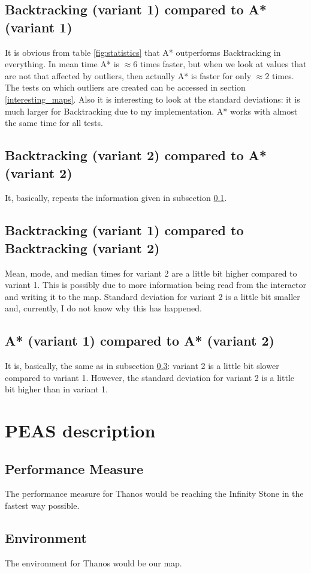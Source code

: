 \documentclass{article}
\begin{document}
\subsection{Backtracking (variant 1) compared to A* (variant 1)} \label{backtracking_1_vs_a_star_1}
It is obvious from table \ref{fig:statistics} that A* outperforms Backtracking in everything.
In mean time A* is $\approx 6$ times faster, but when we look at values that are not that affected by outliers, then actually A* is faster for only $\approx 2$ times.
The tests on which outliers are created can be accessed in section \ref{interesting_maps}.
Also it is interesting to look at the standard deviations: it is much larger for Backtracking due to my implementation. A* works with almost the same time for all tests.
\subsection{Backtracking (variant 2) compared to A* (variant 2)}
It, basically, repeats the information given in subsection \ref{backtracking_1_vs_a_star_1}.
\subsection{Backtracking (variant 1) compared to Backtracking (variant 2)} \label{backtracking_1_vs_backtracking_2}
Mean, mode, and median times for variant 2 are a little bit higher compared to variant 1. This is possibly due to more information being read from the interactor and writing it to the map.
Standard deviation for variant 2 is a little bit smaller and, currently, I do not know why this has happened.
\subsection{A* (variant 1) compared to A* (variant 2)}
It is, basically, the same as in subsection \ref{backtracking_1_vs_backtracking_2}: variant 2 is a little bit slower compared to variant 1. However, the standard deviation for variant 2 is a little bit higher than in variant 1.
\section{PEAS description}
\subsection{Performance Measure}
The performance measure for Thanos would be reaching the Infinity Stone in the fastest way possible.
\subsection{Environment}
The environment for Thanos would be our map.
\end{document}
